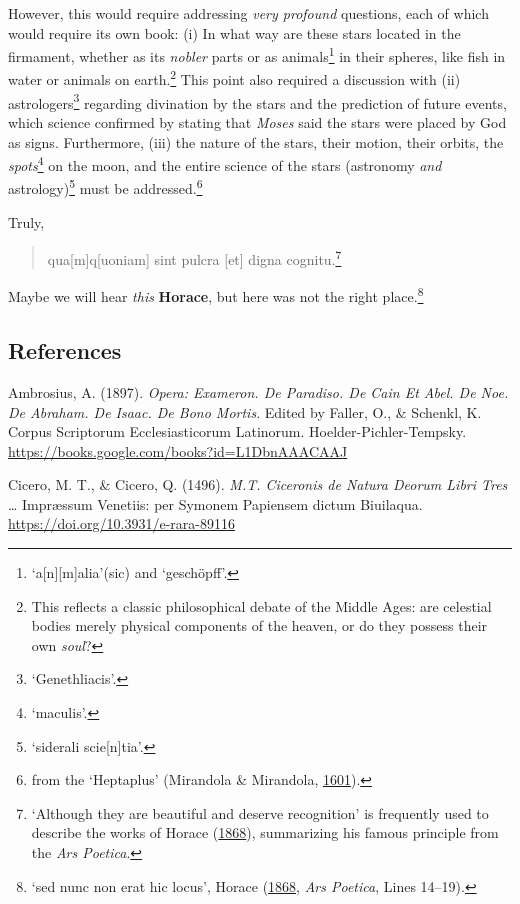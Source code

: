 \documentclass[
]{article}
\begin{document}
However, this would require addressing \emph{very profound} questions,
each of which would require its own book: (i) In what way are these
stars located in the firmament, whether as its \emph{nobler} parts or as
animals\footnote{`a{[}n{]}{[}m{]}alia'(sic) and `geschöpff'.} in their
spheres, like fish in water or animals on earth.\footnote{This reflects
  a classic philosophical debate of the Middle Ages: are celestial
  bodies merely physical components of the heaven, or do they possess
  their own \emph{soul}?} This point also required a discussion with
(ii) astrologers\footnote{`Genethliacis'.} regarding divination by the
stars and the prediction of future events, which science confirmed by
stating that \emph{Moses} said the stars were placed by God as signs.
Furthermore, (iii) the nature of the stars, their motion, their orbits,
the \emph{spots}\footnote{`maculis'.} on the moon, and the entire
science of the stars (astronomy \emph{and} astrology)\footnote{`siderali
  scie{[}n{]}tia'.} must be addressed.\footnote{from the `Heptaplus'
  (Mirandola \& Mirandola,
  \href{https://doi.org/10.3931/e-rara-61217}{1601}).}

Truly,

\begin{quote}
qua{[}m{]}q{[}uoniam{]} sint pulcra {[}et{]} digna cognitu.\footnote{`Although
  they are beautiful and deserve recognition' is frequently used to
  describe the works of Horace
  (\href{https://google.cat/books?id=A28VAAAAYAAJ}{1868}), summarizing
  his famous principle from the \emph{Ars Poetica}.}
\end{quote}

Maybe we will hear \emph{this} \textbf{Horace}, but here was not the
right place.\footnote{`sed nunc non erat hic locus', Horace
  (\href{https://google.cat/books?id=A28VAAAAYAAJ}{1868}, \emph{Ars
  Poetica}, Lines 14--19).}

\hypertarget{references}{%
\subsection{References}\label{references}}

Ambrosius, A. (1897). \emph{Opera: Exameron. De Paradiso. De Cain Et
Abel. De Noe. De Abraham. De Isaac. De Bono Mortis}. Edited by Faller,
O., \& Schenkl, K. Corpus Scriptorum Ecclesiasticorum Latinorum.
Hoelder-Pichler-Tempsky.
\url{https://books.google.com/books?id=L1DbnAAACAAJ}

Cicero, M. T., \& Cicero, Q. (1496). \emph{M.T. Ciceronis de Natura
Deorum Libri Tres} \ldots{} Impræssum Venetiis: per Symonem Papiensem
dictum Biuilaqua. \url{https://doi.org/10.3931/e-rara-89116}
\end{document}
